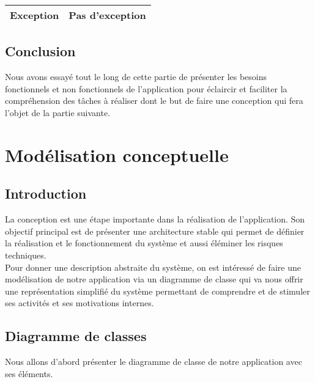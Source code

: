 \documentclass[12]{article}
\begin{document}
\begin{itemize}
\begin{scriptsize}
\begin{tabular}{|l|l|}
Exception         & Pas d'exception                                                                                                                                                                                                                                                                             \\ \hline
\end{tabular}
\end{scriptsize}

\end{itemize}
\subsection{Conclusion}

 Nous avons essayé tout le long de cette partie de présenter les besoins fonctionnels et non fonctionnels de l'application pour éclaircir et faciliter la compréhension des tâches à réaliser dont le but de faire une conception qui fera l'objet de la partie suivante.





\section{Modélisation conceptuelle}

\subsection{Introduction}

La conception est une étape importante dans la réalisation de l'application. Son objectif principal est de présenter une architecture stable qui permet de définier la réalisation et le fonctionnement du système et aussi éléminer les risques techniques.\\

Pour donner une description abstraite du système, on est intéressé de faire une modélisation de notre application via un diagramme de classe qui va nous offrir une représentation simplifié du système permettant de comprendre et de stimuler ses activités et ses motivations internes.

\subsection{Diagramme de classes}

Nous allons d'abord présenter le diagramme de classe de notre application avec ses éléments.\\
\end{document}
